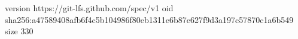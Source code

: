 version https://git-lfs.github.com/spec/v1
oid sha256:a47589408afb6f4c5b104986f80eb1311e6b87e627f9d3a197c57870c1a6b549
size 330
